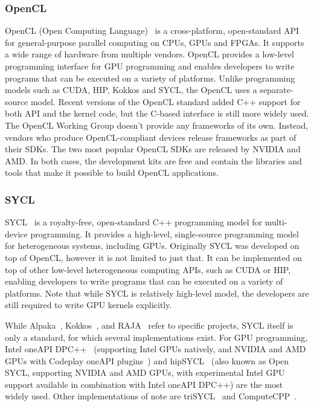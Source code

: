 \subsubsection{OpenCL}


\par
OpenCL (Open Computing Language)~\cite{OpenCL} is a cross-platform, open-standard API for general-purpose parallel computing on CPUs, GPUs and FPGAs.
It supports a wide range of hardware from multiple vendors.
OpenCL provides a low-level programming interface for GPU programming and enables developers to write programs that can be executed on a variety of platforms.
Unlike programming models such as CUDA, HIP, Kokkos and SYCL, the OpenCL uses a separate-source model.
Recent versions of the OpenCL standard added C++ support for both API and the kernel code, but the C-based interface is still more widely used.
The OpenCL Working Group doesn’t provide any frameworks of its own. Instead, vendors who produce OpenCL-compliant devices release frameworks as part of their SDKs.
The two most popular OpenCL SDKs are released by NVIDIA and AMD.
In both cases, the development kits are free and contain the libraries and tools that make it possible to build OpenCL applications.


\subsubsection{SYCL}


\par
SYCL~\cite{sycl} is a royalty-free, open-standard C++ programming model for multi-device programming.
It provides a high-level, single-source programming model for heterogeneous systems, including GPUs. 
Originally SYCL was developed on top of OpenCL, however it is not limited to just that.
It can be implemented on top of other low-level heterogeneous computing APIs, such as CUDA or HIP, enabling developers to write programs that can be executed on a variety of platforms.
Note that while SYCL is relatively high-level model, the developers are still required to write GPU kernels explicitly.


\par
While Alpaka~\cite{alpaka}, Kokkos~\cite{kokkos}, and RAJA~\cite{raja} refer to specific projects, SYCL itself is only a standard, for which several implementations exist.
For GPU programming, Intel oneAPI DPC++~\cite{oneapi-dpc} (supporting Intel GPUs natively, and NVIDIA and AMD GPUs with Codeplay oneAPI plugins~\cite{codeplay-oneapi}) and hipSYCL~\cite{hipsycl} (also known as Open SYCL, supporting NVIDIA and AMD GPUs, with experimental Intel GPU support available in combination with Intel oneAPI DPC++) are the most widely used. 
Other implementations of note are triSYCL~\cite{trisycl} and ComputeCPP~\cite{computecpp}.


